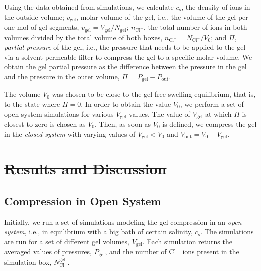 \documentclass[gels,article,accept,pdftex,moreauthors]{Definitions/mdpi}
\newcommand{\ie}{{i.e.,} }
\newcommand{\ncl}{n_\mathrm{Cl^-}}
\newcommand{\Ncl}{N_\mathrm{Cl^-}}
\newcommand{\gel}{^\mathrm{gel}}
\newcommand{\cl}{\mathrm{Cl^-}}
\newcommand{\cs}{c_{\mathrm{s}}}
\newcommand{\Vgel}{V_\mathrm{gel}}
\newcommand{\vgel}{v_\mathrm{gel}}
\newcommand{\Ngel}{N_\mathrm{gel}}
\newcommand{\Pgel}{\Pi}
\newcommand{\Pout}{P_\mathrm{out}}
\newcommand{\Vout}{V_\mathrm{out}}
\newcommand{\Vbox}{V_0}
\providecommand{\DIFdel}[1]{{\protect\color{red}\sout{#1}}}                      %
\providecommand{\DIFdelbegin}{} %
\providecommand{\DIFdelend}{} %
\begin{document}
Using the data obtained from simulations, we calculate  
$\cs$, the density of ions in  the outside volume;
$\vgel$, molar volume of the gel, \ie the volume of the gel per one mol of gel segments, $\vgel = \Vgel / \Ngel$;
$\ncl$, the total number of ions in both volumes divided by the total volume of both boxes, $\ncl = \Ncl/\Vbox$; and
$\Pgel$, \emph{partial pressure} of the gel, \ie the pressure that needs to be applied to the gel via a solvent-permeable filter to compress the gel to a specific molar volume.
We obtain the gel partial pressure as the difference between the pressure in the gel and the pressure in the outer volume, $\Pgel=P_\mathrm{gel} - \Pout$.



The volume $\Vbox$ was chosen to be close to the gel free-swelling equilibrium, that is, to the state where $\Pgel = 0$.
In order to obtain the value $\Vbox$, we perform a set of open system simulations for various $\Vgel$ values.
The value of $\Vgel$ at which $\Pgel$ is closest to zero is chosen as $\Vbox$.
Then, as soon as $\Vbox$ is defined, we compress the gel in the \emph{closed system} with varying values of $\Vgel<\Vbox$ and $\Vout= \Vbox - \Vgel$.



\DIFdelbegin \section{\DIFdel{Results and Discussion}}
\addtocounter{section}{-1}%

\DIFdelend \subsection{Compression in Open System}

Initially, we run a set of simulations modeling the gel compression in an \emph{open system}, \ie in equilibrium with a big bath of certain salinity, $\cs$. 
The simulations are run for a set of different gel volumes, $\Vgel$. 
Each simulation returns the averaged values of pressures, $P_\mathrm{gel}$, and the number of $\cl$ ions present in the simulation box, $\Ncl\gel$. 
\end{document}
